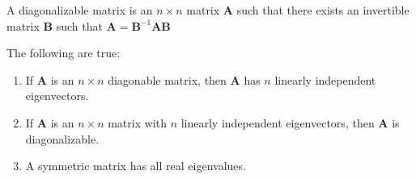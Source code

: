\documentclass[crop=false,class=article,oneside]{standalone}
\begin{document}
        \begin{definition}
            A diagonalizable matrix is an
            ${n}\times{n}$ matrix
            $\mathbf{A}$ such that there exists
            an invertible matrix $\mathbf{B}$
            such that
            $\mathbf{A}=\mathbf{B}^{-1}\mathbf{A}\mathbf{B}$
        \end{definition}
        \begin{theorem*}
            The following are true:
            \begin{enumerate}
                \item If $\mathbf{A}$ is an ${n}\times{n}$
                    diagonable matrix, then $\mathbf{A}$
                    has $n$ linearly independent
                    eigenvectors.
                \item If $\mathbf{A}$ is an ${n}\times{n}$
                    matrix with $n$ linearly independent
                    eigenvectors, then $\mathbf{A}$
                    is diagonalizable.
                \item A symmetric matrix has all real
                    eigenvalues.
            \end{enumerate}
        \end{theorem*}
\end{document}
